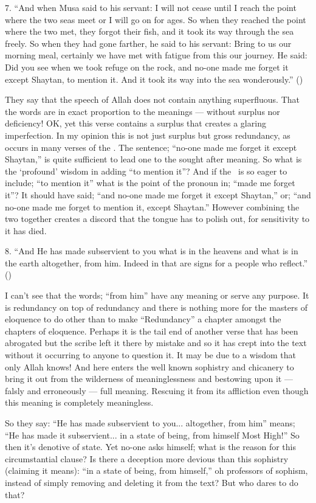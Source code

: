 \documentclass[12pt]{memoir}
\begin{document}
7. “And when Musa said to his servant:
I will not cease until I reach the point where the two seas meet
or I will go on for ages. So when they reached the point where the two met,
they forgot their fish, and it took its way through the sea freely.
So when they had gone farther, he said to his servant:
Bring to us our morning meal,
certainly we have met with fatigue from this our journey.
He said: Did you see when we took refuge on the rock,
and no-one made me forget it except Shaytan, to mention it.
And it took its way into the sea wonderously.” ()

They say that the speech of Allah does not contain anything superfluous.
That the words are in exact proportion to the meanings —
without surplus nor deficiency!
OK, yet this verse contains a surplus that creates a glaring imperfection.
In my opinion this is not just surplus but gross redundancy,
as occurs in many verses of the \Quran. The sentence;
“no-one made me forget it except Shaytan,”
is quite sufficient to lead one to the sought after meaning.
So what is the ‘profound’ wisdom in adding “to mention it”?
And if the \Quran\ is so eager to include;
“to mention it” what is the point of the pronoun in; “made me forget it”?
It should have said; “and no-one made me forget it except Shaytan,” or;
“and no-one made me forget to mention it, except Shaytan.”
However combining the two together creates a discord
that the tongue has to polish out, for sensitivity to it has died.

8. “And He has made subservient to you what is in the heavens
and what is in the earth altogether, from him.
Indeed in that are signs for a people who reflect.”
()

I can’t see that the words;
“from him” have any meaning or serve any purpose.
It is redundancy on top of redundancy
and there is nothing more for the masters of eloquence to do other than
to make “Redundancy” a chapter amongst the chapters of eloquence.
Perhaps it is the tail end of another verse that has been abrogated
but the scribe left it there by mistake and so it has crept into the text
without it occurring to anyone to question it.
It may be due to a wisdom that only Allah knows!
And here enters the well known sophistry and chicanery to bring it out
from the wilderness of meaninglessness and bestowing upon it —
falsly and erroneously — full meaning.
Rescuing it from its affliction even though
this meaning is completely meaningless.

So they say: “He has made subservient to you... altogether, from him” means;
“He has made it subservient... in a state of being, from himself Most High!”
So then it’s denotive of state.
Yet no-one asks himself;
what is the reason for this circumstantial clause?
Is there a deception more devious than this sophistry (claiming it means):
“in a state of being, from himself,” oh professors of sophism,
instead of simply removing and deleting it from the text?
But who dares to do that?
\end{document}
